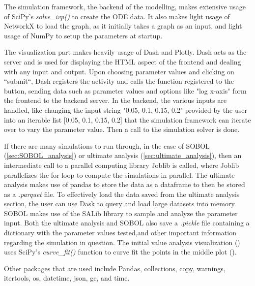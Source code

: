 The simulation framework, the backend of the modelling, makes extensive usage of SciPy's \textit{solve\_ivp()} to create the ODE data. 
It also makes light usage of NetworkX to load the graph, as it initially takes a graph as an input, and light usage of NumPy to setup the parameters at startup. \newline 

The visualization part makes heavily usage of Dash and Plotly. 
Dash acts as the server and is used for displaying the HTML aspect of the frontend and dealing with any input and output. 
Upon choosing parameter values and clicking on “submit“, Dash registers the activity and calls the function registered to the button, sending data such as parameter values and options like "log x-axis" form the frontend to the backend server. 
In the backend, the various inputs are handled, like changing the input string "0.05, 0.1, 0.15, 0.2" provided by the user into an iterable list [0.05, 0.1, 0.15, 0.2] that the simulation framework can iterate over to vary the parameter value. 
Then a call to the simulation solver is done. \newline 

If there are many simulations to run through, in the case of SOBOL (\ref{sec:SOBOL_analysis}) or ultimate analysis (\ref{sec:ultimate_analysis}), then an intermediate call to a parallel computing library Joblib is called, where Joblib parallelizes the for-loop to compute the simulations in parallel. 
The ultimate analysis makes use of pandas to store the data as a dataframe to then be stored as a \textit{.parquet} file. 
To effectively load the data saved from the ultimate analysis section, the user can use Dask to query and load large datasets into memory. \newline 
SOBOL makes use of the SALib library to sample and analyze the parameter input. 
Both the ultimate analysis and SOBOL also save a \textit{.pickle} file containing a dictionary with the parameter values tested,and other important information regarding the simulation in question. \newline
The initial value analysis visualization () uses SciPy's \textit{curve\_fit()} function to curve fit the points in the middle plot (). 

Other packages that are used include Pandas, collections, copy, warnings, itertools, os, datetime, json, gc, and time. 
